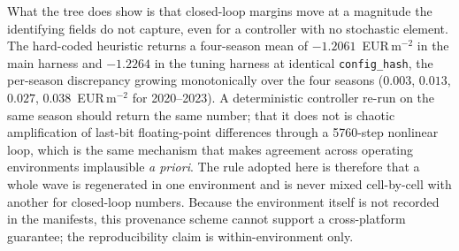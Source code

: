 What the tree does show is that closed-loop margins move at a magnitude the identifying
fields do not capture, even for a controller with no stochastic element. The hard-coded
heuristic returns a four-season mean of $-1.2061$~EUR\,m$^{-2}$ in the main harness and
$-1.2264$ in the tuning harness at identical \texttt{config\_hash}, the per-season
discrepancy growing monotonically over the four seasons ($0.003$, $0.013$, $0.027$,
$0.038$~EUR\,m$^{-2}$ for 2020--2023). A deterministic controller re-run on the same season
should return the same number; that it does not is chaotic amplification of last-bit
floating-point differences through a 5760-step nonlinear loop, which is the same
mechanism that makes agreement across operating environments implausible \emph{a priori}.
The rule adopted here is therefore that a whole wave is regenerated in one environment
and is never mixed cell-by-cell with another for closed-loop numbers. Because the
environment itself is not recorded in the manifests, this provenance scheme cannot support
a cross-platform guarantee; the reproducibility claim is within-environment only.


